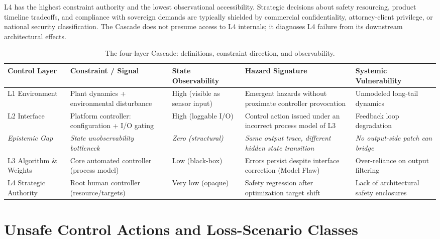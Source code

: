 \documentclass[11pt]{article}
\begin{document}
L4 has the highest constraint authority and the lowest observational accessibility. Strategic decisions about safety resourcing, product timeline tradeoffs, and compliance with sovereign demands are typically shielded by commercial confidentiality, attorney-client privilege, or national security classification. The Cascade does not presume access to L4 internals; it diagnoses L4 failure from its downstream architectural effects.

\begin{table}[!htbp]
\centering
\small
\caption{The four-layer Cascade: definitions, constraint direction, and observability.}
\label{tab:layers}
{\setlength{\tabcolsep}{4pt}
\begin{tabularx}{\columnwidth}{@{}P{1.8cm} P{2.8cm} Y Y Y@{}}
\toprule
\textbf{Control Layer} & \textbf{Constraint / Signal} & \textbf{State Observability} & \textbf{Hazard Signature} & \textbf{Systemic Vulnerability} \\
\midrule
L1 Environment & Plant dynamics + environmental disturbance & High (visible as sensor input) & Emergent hazards without proximate controller provocation & Unmodeled long-tail dynamics \\
L2 Interface & Platform controller: configuration + I/O gating & High (loggable I/O) & Control action issued under an incorrect process model of L3 & Feedback loop degradation \\
\textit{Epistemic Gap} & \textit{State unobservability bottleneck} & \textit{Zero (structural)} & \textit{Same output trace, different hidden state transition} & \textit{No output-side patch can bridge} \\
L3 Algorithm \& Weights & Core automated controller (process model) & Low (black-box) & Errors persist despite interface correction (Model Flaw) & Over-reliance on output filtering \\
L4 Strategic Authority & Root human controller (resource/targets) & Very low (opaque) & Safety regression after optimization target shift & Lack of architectural safety enclosures \\
\bottomrule
\end{tabularx}}
\end{table}


\section{Unsafe Control Actions and Loss-Scenario Classes}\label{sec:patterns}
\end{document}
